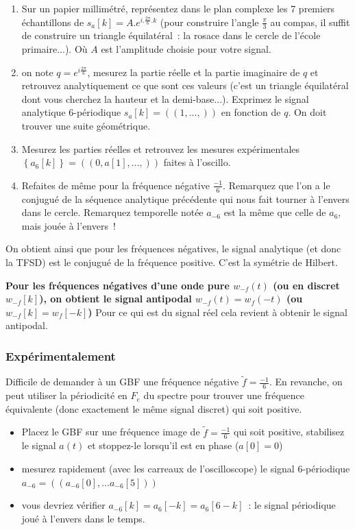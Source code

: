 \documentclass[a4paper,twoside,12pt]{report}           %
\begin{document}
\begin{enumerate}
\item Sur un papier millimétré, représentez dans le plan complexe les
  7 premiers échantillons de $s_a[k]=A.e^{i.\frac{2\pi}{6}.k}$ (pour
  construire l'angle $\frac{\pi}{3}$ au compas, il suffit de
  construire un triangle équilatéral~: la rosace dans le cercle de
  l'école primaire...).  Où $A$ est l'amplitude choisie pour votre
  signal.
\item on note $q=e^{i\frac{2\pi}{6}}$, mesurez la partie réelle et la
  partie imaginaire de $q$ et retrouvez analytiquement ce que sont ces
  valeurs (c'est un triangle équilatéral dont vous cherchez la hauteur
  et la demi-base...).  Exprimez le signal analytique 6-périodique
  $s_a[k] = (\!( 1, ..., )\!)$ en fonction de $q$. On doit trouver une
  suite géométrique.
\item Mesurez les parties réelles et retrouvez les mesures
  expérimentales $\left\{a_6[k]\right\}=(\!(0,a[1], \dots, )\!)$
  faites à l'oscillo.
\item Refaites de même pour la fréquence négative
  $\frac{-1}{6}$. Remarquez que l'on a le conjugué de la séquence
  analytique précédente qui nous fait tourner à l'envers dans le
  cercle. Remarquez temporelle notée $a_{-6}$ est la même que celle de
  $a_6$, mais jouée à l'envers~!
\end{enumerate}

On obtient ainsi que pour les fréquences négatives, le signal
analytique (et donc la TFSD) est le conjugué de la fréquence
positive. C'est la symétrie de Hilbert.

\textbf{Pour les fréquences négatives d'une onde pure $w_{-f}(t)$ (ou
  en discret $w_{-f}[k]$), on obtient le signal antipodal
  $w_{-f}(t) = w_f(-t)$ (ou $w_{-f}[k]=w_f[-k]$)} Pour ce qui est du
signal réel cela revient à obtenir le signal antipodal.

\subsubsection{Expérimentalement}


Difficile de demander à un GBF une fréquence négative
$\widetilde{f}=\frac{-1}{6}$. En revanche, on peut utiliser la
périodicité en $F_e$ du spectre pour trouver une fréquence équivalente
(donc exactement le même signal discret) qui soit positive.

\begin{itemize}
\item Placez le GBF sur une fréquence image de
  $\widetilde{f}=\frac{-1}{6}$ qui soit positive, stabilisez le signal
  $a(t)$ et stoppez-le lorsqu'il est en phase ($a[0]=0$)
\item mesurez rapidement (avec les carreaux de l'oscilloscope) le
  signal 6-périodique $a_{-6}=(\!( a_{-6}[0], \dots a_{-6}[5])\!)$
\item vous devriez vérifier $a_{-6}[k]=a_{6}[-k]=a_{6}[6-k]$~: le
  signal périodique joué à l'envers dans le temps.
\end{itemize}
\end{document}
